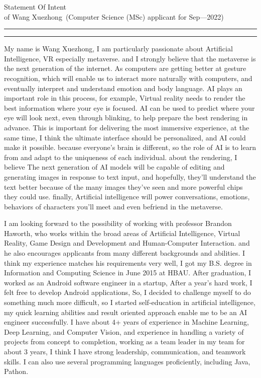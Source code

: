 \documentclass{article}
\newcommand{\soptitle}{Statement Of Intent}
\newcommand{\yourname}{Wang Xuezhong}
\begin{document}
\begin{center}\LARGE\soptitle\\
\large of \yourname\ (Computer Science (MSc) applicant for Sep---2022)
\end{center}

\hrule
\vspace{1pt}
\hrule height 1pt

\bigskip


My name is Wang Xuezhong, I am particularly passionate about Artificial Intelligence, VR especially metaverse. and I strongly believe that the metaverse is the next generation of the internet. As computers are getting better at gesture recognition, which will enable us to interact more naturally with computers, and eventually interpret and understand emotion and body language. AI plays an important role in this process, for example, Virtual reality needs to render the best information where your eye is focused. AI can be used to predict where your eye will look next, even through blinking, to help prepare the best rendering in advance. This is important for delivering the most immersive experience, at the same time, I think the ultimate interface should be personalized, and AI could make it possible. because everyone’s brain is different, so the role of AI is to learn from and adapt to the uniqueness of each individual. about the rendering, I believe The next generation of AI models will be capable of editing and generating images in response to text input, and hopefully, they’ll understand the text better because of the many images they’ve seen and more powerful chips they could use. finally, Artificial intelligence will power conversations, emotions, behaviors of characters you'll meet and even befriend in the metaverse.

I am looking forward to the possibility of working with professor Brandon Haworth, who works within the broad areas of Artificial Intelligence, Virtual Reality, Game Design and Development and Human-Computer Interaction. and he also encourages applicants from many different backgrounds and abilities. I think my experience matches his requirements very well, I got my B.S. degree in Information and Computing Science in June 2015 at HBAU. After graduation, I worked as an Android software engineer in a startup, After a year's hard work, I felt free to develop Android applications, So, I decided to challenge myself to do something much more difficult, so I started self-education in artificial intelligence, my quick learning abilities and result oriented approach enable me to be an AI engineer successfully. I have about  4+ years of experience in Machine Learning, Deep Learning, and Computer Vision, and experience in handling a variety of projects from concept to completion, working as a team leader in my team for about 3 years, I think I have strong leadership, communication, and teamwork skills. I can also use several programming languages ​​proficiently, including Java, Pathon.
\end{document}
